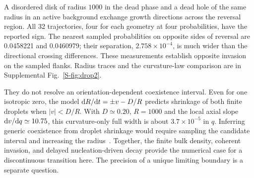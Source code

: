 A disordered disk of radius $1000$ in the dead phase and a dead hole of
the same radius in an active background exchange growth directions
across the reversal region. All 32 trajectories, four for each geometry
at four probabilities, have the reported sign. The nearest sampled probabilities on opposite sides of reversal are 0.0458221 and 0.0460979; their separation,
$2.758\times10^{-4}$, is much wider than the directional crossing
differences. These measurements establish opposite invasion on the
sampled flanks. Radius traces and the curvature-law comparison are in
Supplemental Fig.~\ref{S-fig:drop2}.

They do not resolve an orientation-dependent coexistence interval.
Even for one isotropic zero, the model
$\mathrm{d} R/\mathrm{d} t=\pm v-D/R$ predicts shrinkage of both finite droplets
when $|v|<D/R$. With $D\simeq0.20$, $R=1000$ and the local axial
slope $\mathrm{d} v/\mathrm{d} q\simeq10.75$, this curvature-only full width is
about $3.7\times10^{-5}$ in $q$. Inferring generic coexistence from
droplet shrinkage would require sampling the candidate interval and
increasing the radius~\cite{wang2015,liu2018}.
Together, the finite bulk density, coherent invasion, and delayed
nucleation-driven decay provide the numerical case for a discontinuous
transition here. The precision of a unique limiting boundary is a
separate question.
